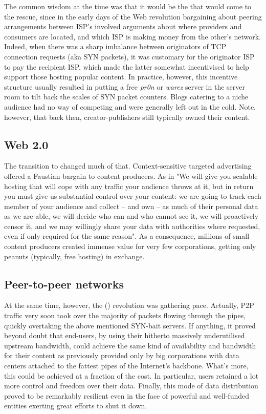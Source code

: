 The common wisdom at the time was that it would be the  that would come to the rescue, since in the early days of the Web revolution bargaining about peering arrangements between ISP's involved arguments about where providers and consumers are located, and which ISP is making money from the other's network. Indeed, when there was a sharp imbalance between originators of TCP connection requests (aka SYN packets), it was customary for the originator ISP to pay the recipient ISP, which made the latter somewhat incentivised to help support those hosting popular content. In practice, however, this incentive structure usually resulted in putting a free \emph{pr0n} or \emph{warez} server in the server room to tilt back the scales of SYN packet counters. Blogs catering to a niche audience had no way of competing and were generally left out in the cold. Note, however, that back then, creator-publishers still typically owned their content.

\subsection{Web 2.0 \statusgreen}\label{sec:web_2}

The transition to  changed much of that. Context-sensitive targeted advertising offered a Faustian bargain to content producers. As in "We will give you scalable hosting that will cope with any traffic your audience throws at it, but in return you must give us substantial control over your content: we are going to track each member of your audience and collect -- and own -- as much of their personal data as we are able, we will decide who can and who cannot see it, we will proactively censor it, and we may willingly share your data with authorities where requested, even if only required for the same reason". As a consequence, millions of small content producers created immense value for very few corporations, getting only peanuts (typically, free hosting) in exchange.

\subsection{Peer-to-peer networks \statusgreen}\label{sec:peer_to_peer}

At the same time, however, the  () revolution was gathering pace. Actually, P2P traffic very soon took over the majority of packets flowing through the pipes, quickly overtaking the above mentioned SYN-bait servers. If anything, it proved beyond doubt that end-users, by using their hitherto massively underutilised upstream bandwidth, could achieve the same kind of availability and bandwidth for their content as previously provided only by big corporations with data centers attached to the fattest pipes of the Internet's backbone. What's more, this could be achieved at a fraction of the cost. In particular, users retained a lot more control and freedom over their data. Finally, this mode of data distribution proved to be remarkably resilient even in the face of powerful and well-funded entities exerting great efforts to shut it down.


